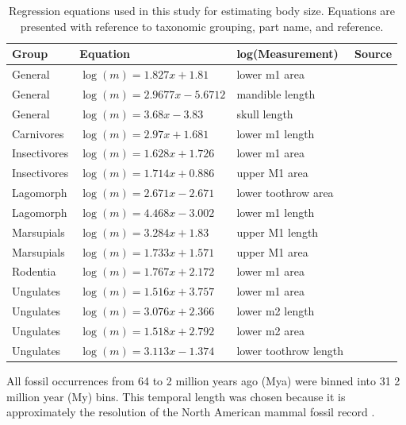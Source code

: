 \begin{table}[ht]
  \centering
  \caption{Regression equations used in this study for estimating body size. Equations are presented with reference to taxonomic grouping, part name, and reference.}
  \begin{tabular}{l | l | l | l}
    \hline
    Group & Equation & log(Measurement) & Source \\
    \hline
    General & \(\log(m) = 1.827x + 1.81\) & lower m1 area &  \cite{Legendre1986} \\
    General & \(\log(m) = 2.9677x - 5.6712\) & mandible length & \cite{Foster2009a} \\
    General & \(\log(m) = 3.68x - 3.83\) & skull length & \cite{Luo2001} \\
    Carnivores & \(\log(m) = 2.97x + 1.681\) & lower m1 length & \cite{VanValkenburgh1990} \\
    Insectivores & \(\log(m) = 1.628x + 1.726\) & lower m1 area & \cite{Bloch1998} \\
    Insectivores & \(\log(m) = 1.714x + 0.886\) & upper M1 area & \cite{Bloch1998} \\
    Lagomorph & \(\log(m) = 2.671x - 2.671\) & lower toothrow area & \cite{Tomiya2013} \\
    Lagomorph & \(\log(m) = 4.468x - 3.002\) & lower m1 length & \cite{Tomiya2013} \\
    Marsupials & \(\log(m) = 3.284x + 1.83\) & upper M1 length & \cite{Gordon2003} \\
    Marsupials & \(\log(m) = 1.733x + 1.571\) & upper M1 area & \cite{Gordon2003} \\
    Rodentia & \(\log(m) = 1.767x + 2.172\) & lower m1 area & \cite{Legendre1986} \\
    Ungulates & \(\log(m) = 1.516x + 3.757\) & lower m1 area & \cite{Mendoza2006} \\
    Ungulates & \(\log(m) = 3.076x + 2.366\) & lower m2 length & \cite{Mendoza2006} \\
    Ungulates & \(\log(m) = 1.518x + 2.792\) & lower m2 area & \cite{Mendoza2006} \\
    Ungulates & \(\log(m) = 3.113x - 1.374\) & lower toothrow length & \cite{Mendoza2006} \\
    \hline
  \end{tabular}
  \label{tab:mass_esteq}
\end{table}


All fossil occurrences from 64 to 2 million years ago (Mya) were binned into 31 2 million year (My) bins. This temporal length was chosen because it is approximately the resolution of the North American mammal fossil record \citep{Alroy1996a,Alroy2000g,Marcot2014,Alroy2009}.



